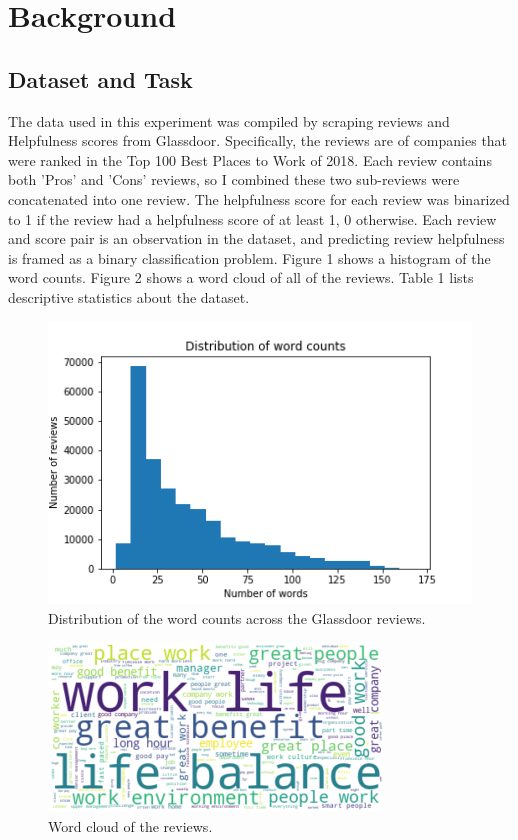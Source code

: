 \documentclass[11pt,a4paper]{article}
\begin{document}
	\section{Background}
	
	\subsection{Dataset and Task}
	The data used in this experiment was compiled by scraping reviews and Helpfulness scores from Glassdoor. Specifically, the reviews are of companies that were ranked in the Top 100 Best Places to Work of 2018. Each review contains both 'Pros' and 'Cons' reviews, so I combined these two sub-reviews were concatenated into one review. The helpfulness score for each review was binarized to 1 if the review had a helpfulness score of at least 1, 0 otherwise. Each review and score pair is an observation in the dataset, and predicting review helpfulness is framed as a binary classification problem. Figure 1 shows a histogram of the word counts. Figure 2 shows a word cloud of all of the reviews. Table 1 lists descriptive statistics about the dataset.
	
	\begin{figure}[h]
	\begin{center}
		\includegraphics[scale=0.5]{wordcounts}
		\caption[scale=0.75]{Distribution of the word counts across the Glassdoor reviews.}
	\end{center}
	\end{figure}

	\begin{figure}[h]
	\begin{center}
		\includegraphics[scale=0.75]{wordcloud}
		\caption[scale=0.75]{Word cloud of the reviews.}
	\end{center}
	\end{figure}
\end{document}
